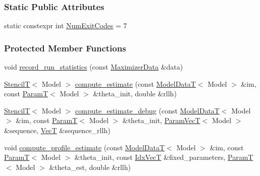 \subsubsection*{Static Public Attributes}
\begin{DoxyCompactItemize}
\item 
static constexpr int \hyperlink{classmappel_1_1IterativeMaximizer_a04888d87aa205d54e7cae5a97d1c1e75}{Num\+Exit\+Codes} = 7
\end{DoxyCompactItemize}
\subsubsection*{Protected Member Functions}
\begin{DoxyCompactItemize}
\item 
void \hyperlink{classmappel_1_1IterativeMaximizer_af5614c292f139b5032b733a8d6fdf73e}{record\+\_\+run\+\_\+statistics} (const \hyperlink{classmappel_1_1IterativeMaximizer_1_1MaximizerData}{Maximizer\+Data} \&data)
\item 
\hyperlink{namespacemappel_a3a06598240007876f8c4bf834ad86197}{StencilT}$<$ Model $>$ \hyperlink{classmappel_1_1IterativeMaximizer_ad83f7b0a5b4d412f419b6089e73a66e0}{compute\+\_\+estimate} (const \hyperlink{namespacemappel_a97f050df953605381ae9c901c3b125f1}{Model\+DataT}$<$ Model $>$ \&im, const \hyperlink{namespacemappel_a667925cb0d6c0e49f2f035cc5a9a6857}{ParamT}$<$ Model $>$ \&theta\+\_\+init, double \&rllh)
\item 
\hyperlink{namespacemappel_a3a06598240007876f8c4bf834ad86197}{StencilT}$<$ Model $>$ \hyperlink{classmappel_1_1IterativeMaximizer_aa45c11a399f29985fc9bd3365e809335}{compute\+\_\+estimate\+\_\+debug} (const \hyperlink{namespacemappel_a97f050df953605381ae9c901c3b125f1}{Model\+DataT}$<$ Model $>$ \&im, const \hyperlink{namespacemappel_a667925cb0d6c0e49f2f035cc5a9a6857}{ParamT}$<$ Model $>$ \&theta\+\_\+init, \hyperlink{namespacemappel_a0f86d3153e4e27b095012f140eea58de}{Param\+VecT}$<$ Model $>$ \&sequence, \hyperlink{namespacemappel_a2225ad69f358daa3f4f99282a35b9a3a}{VecT} \&sequence\+\_\+rllh)
\item 
void \hyperlink{classmappel_1_1IterativeMaximizer_a1999fd1fa63c803b3aad87695fc82843}{compute\+\_\+profile\+\_\+estimate} (const \hyperlink{namespacemappel_a97f050df953605381ae9c901c3b125f1}{Model\+DataT}$<$ Model $>$ \&im, const \hyperlink{namespacemappel_a667925cb0d6c0e49f2f035cc5a9a6857}{ParamT}$<$ Model $>$ \&theta\+\_\+init, const \hyperlink{namespacemappel_ac63743dcd42180127307cd0e4ecdd784}{Idx\+VecT} \&fixed\+\_\+parameters, \hyperlink{namespacemappel_a667925cb0d6c0e49f2f035cc5a9a6857}{ParamT}$<$ Model $>$ \&theta\+\_\+est, double \&rllh)

\end{DoxyCompactItemize}
